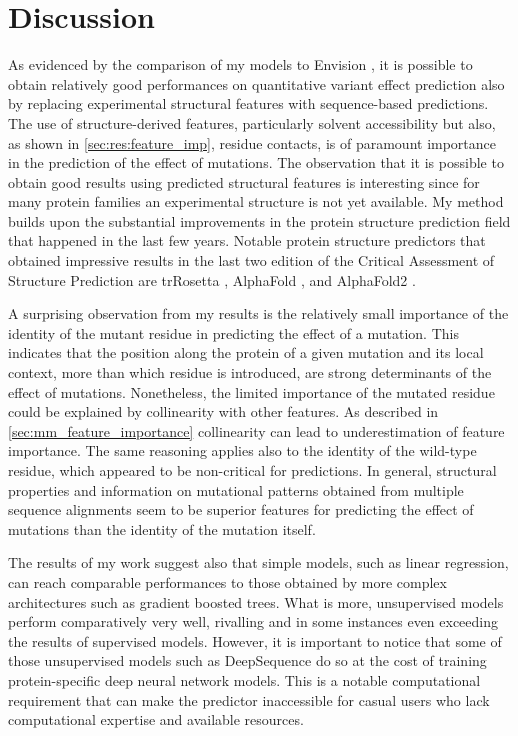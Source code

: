 \cleardoublepage%
\chapter{Discussion}

As evidenced by the comparison of my models to Envision \parencite{Gray2018}, it is possible to obtain relatively good performances on quantitative variant effect prediction also by replacing experimental structural features with sequence-based predictions.
The use of structure-derived features, particularly solvent accessibility \parencite{Savojardo2021} but also, as shown in \cref{sec:res:feature_imp}, residue contacts, is of paramount importance in the prediction of the effect of mutations.
The observation that it is possible to obtain good results using predicted structural features is interesting since for many protein families an experimental structure is not yet available.
My method builds upon the substantial improvements in the protein structure prediction field that happened in the last few years.
Notable protein structure predictors that obtained impressive results in the last two edition of the Critical Assessment of Structure Prediction \parencite{Abriata2019} are trRosetta \parencite[][CASP13]{Yang2020}, AlphaFold \parencite[][CASP13]{Senior2020}, and AlphaFold2 \parencite[][CASP14]{Jumper2020}.

A surprising observation from my results is the relatively small importance of the identity of the mutant residue in predicting the effect of a mutation.
This indicates that the position along the protein of a given mutation and its local context, more than which residue is introduced, are strong determinants of the effect of mutations.
Nonetheless, the limited importance of the mutated residue could be explained by collinearity with other features.
As described in \cref{sec:mm_feature_importance} collinearity can lead to underestimation of feature importance.
The same reasoning applies also to the identity of the wild-type residue, which appeared to be non-critical for predictions.
In general, structural properties and information on mutational patterns obtained from multiple sequence alignments seem to be superior features for predicting the effect of mutations than the identity of the mutation itself.

The results of my work suggest also that simple models, such as linear regression, can reach comparable performances to those obtained by more complex architectures such as gradient boosted trees.
What is more, unsupervised models perform comparatively very well, rivalling and in some instances even exceeding the results of supervised models.
However, it is important to notice that some of those unsupervised models such as DeepSequence \parencite{Riesselman2018} do so at the cost of training protein-specific deep neural network models.
This is a notable computational requirement that can make the predictor inaccessible for casual users who lack computational expertise and available resources.

